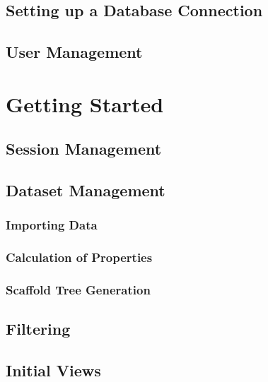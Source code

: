 \documentclass[a4paper,10pt,english,twoside,bibliography=totoc,listof=totoc]{scrbook}
\begin{document}
    \section{Setting up a Database Connection} \label{sec:scaffoldhunter:databaseconnection}
    	
    \section{User Management}
    	

\chapter{Getting Started}
  \section{Session Management}
  	\label{sec:scaffoldhunter:SessionManagement}
  	
  \section{Dataset Management} \label{sec:scaffoldhunter:datasetmanagement}
    
    \subsection{Importing Data} \label{sec:scaffoldhunter:import}
      
    \subsection{Calculation of Properties} \label{sec:scaffoldhunter:propertycalculation}
      
    \subsection{Scaffold Tree Generation} \label{sec:scaffoldhunter:treegeneration}
      
  \section{Filtering} \label{sec:scaffoldhunter:filtering}
  	
  \section{Initial Views} \label{sec:scaffoldhunter:initial_views}
  	
\end{document}
